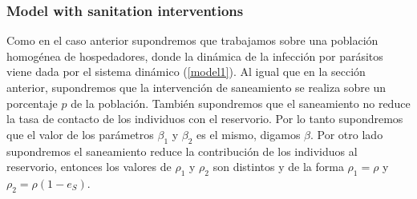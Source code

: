\documentclass[12pt,a4paper]{article}
\theoremstyle{plain}%
\theoremstyle{definition}
\theoremstyle{remark}
\begin{document}
	\subsubsection{Model with sanitation interventions}
	Como en el caso anterior supondremos que trabajamos sobre una población homogénea de hospedadores, 
	donde la dinámica de la infección por parásitos  viene dada por el sistema dinámico (\ref{model1}).
	Al igual que en la sección anterior, supondremos que la intervención de saneamiento se realiza sobre un porcentaje  $p$ de la población. También supondremos que el saneamiento no reduce la tasa de contacto de los individuos con el reservorio. 
	Por lo tanto supondremos que el valor de los parámetros $\beta_1$ y $\beta_2$ es el mismo, digamos $\beta$.
	Por otro lado supondremos el saneamiento reduce la contribución de los individuos al reservorio, entonces los valores de $\rho_1$ y $\rho_2$ son distintos y de la forma $\rho_1=\rho$ y $\rho_2=\rho(1-e_S)$. 	
	
\end{document}
